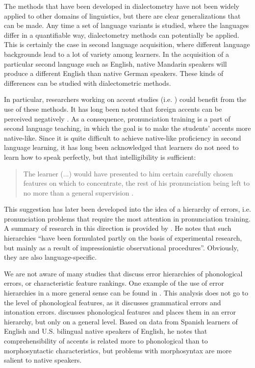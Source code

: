 \documentclass[output=paper]{LSP/langsci}
\begin{document}
The methods that have been developed in dialectometry have not been widely applied to other domains of linguistics, but there are clear generalizations that can be made. Any time a set of language variants is studied, where the languages differ in a quantifiable way, dialectometry methods can potentially be applied. This is certainly the case in second language acquisition, where different language backgrounds lead to a lot of variety among learners. In the acquisition of a particular second language such as English, native Mandarin speakers will produce a different English than native German speakers. These kinds of differences can be studied with dialectometric methods.

In particular, researchers working on accent studies (i.e. \citealt{wells_accents_1982, waniek-klimczak_issues_2008}) could benefit from the use of these methods. It has long been noted that foreign accents can be perceived negatively \citep{ryan_social_1983}. As a consequence, pronunciation training is a part of second language teaching, in which the goal is to make the students' accents more native-like. Since it is quite difficult to achieve native-like proficiency in second language learning, it has long been acknowledged that learners do not need to learn how to speak perfectly, but that intelligibility is sufficient:
\begin{quote}
The learner (...) would have presented to him certain carefully chosen features on which to concentrate, the rest of his pronunciation being left to no more than a general supervision \citep[93]{abercrombie_problems_1956}.
\end{quote}
This suggestion has later been developed into the idea of a hierarchy of errors, i.e. pronunciation problems that require the most attention in pronunciation training. A summary of research in this direction is provided by \citet[7--15]{van_den_doel_evaluation_2006}. He notes that such hierarchies ``have been formulated partly on the basis of experimental research, but mainly as a result of impressionistic observational procedures''. Obviously, they are also language-specific.

We are not aware of many studies that discuss error hierarchies of phonological errors, or characteristic feature rankings. One example of the use of error hierarchies in a more general sense can be found in \citet{rifkin_error_1995}. This analysis does not go to the level of phonological features, as it discusses grammatical errors and intonation errors. \citet{gynan_comprehension_1985} discusses phonological features and places them in an error hierarchy, but only on a general level. Based on data from Spanish learners of English and U.S. bilingual native speakers of English, he notes that comprehensibility of accents is related more to phonological than to morphosyntactic characteristics, but problems with morphosyntax are more salient to native speakers.
\end{document}
